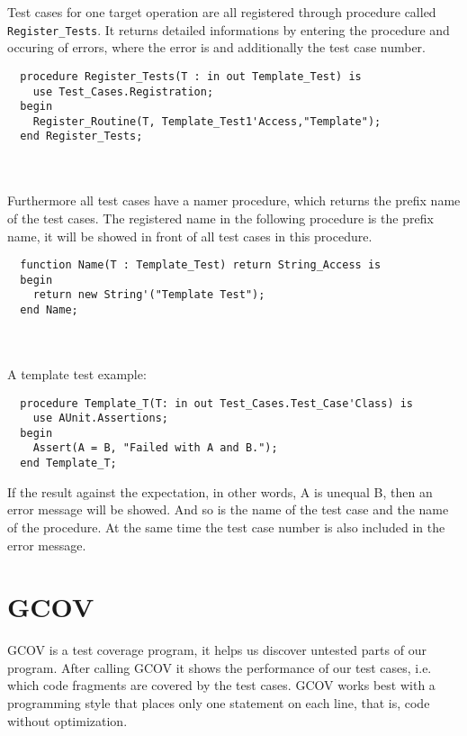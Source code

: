 Test cases for one target operation are all registered through
procedure called \texttt{Register\_\-Tests}. It returns detailed
informations by entering the procedure and occuring of errors, where
the error is and additionally the test case number.
\begin{lstlisting}
  procedure Register_Tests(T : in out Template_Test) is
    use Test_Cases.Registration;
  begin
    Register_Routine(T, Template_Test1'Access,"Template");
  end Register_Tests;
\end{lstlisting}\\ \ \\
Furthermore all test cases have a namer procedure, which returns the prefix name of the test cases. The registered name in the following procedure is the prefix name, it will be showed in front of all test cases in this procedure.
\begin{lstlisting}
  function Name(T : Template_Test) return String_Access is
  begin
	return new String'("Template Test");
  end Name;
\end{lstlisting}\\ \ \\
A template test example:
\begin{lstlisting}
  procedure Template_T(T: in out Test_Cases.Test_Case'Class) is
    use AUnit.Assertions; 
  begin      
    Assert(A = B, "Failed with A and B.");
  end Template_T;
\end{lstlisting}
If the result against the expectation, in other words, A is unequal B, then an error message will be showed. And so is the name of the test case and the name of the procedure. At the same time the test case number is also included in the error message.

\section{GCOV}
GCOV is a test coverage program, it helps us discover untested parts of our program. After calling GCOV it shows the performance of our test cases, i.e. which code fragments are covered by the test cases. GCOV works best with a programming style that places only one statement on each line, that is, code without optimization.

